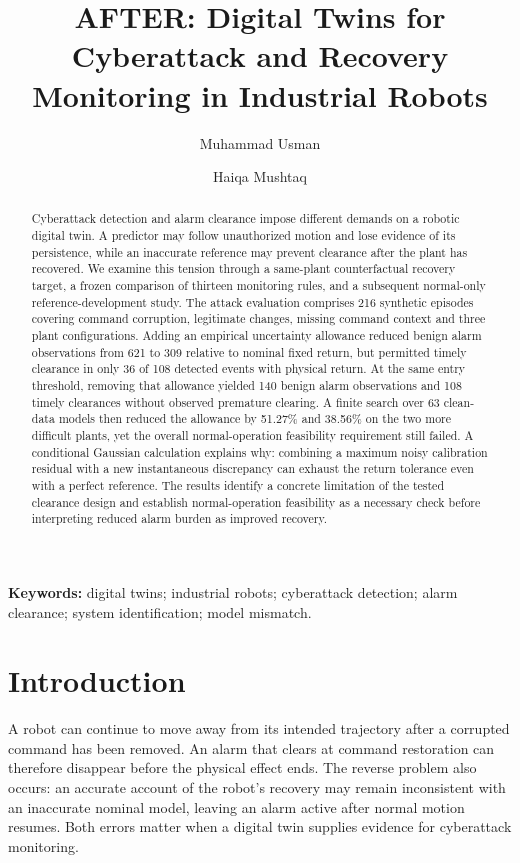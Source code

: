 \documentclass[11pt]{article}
\title{AFTER: Digital Twins for Cyberattack and Recovery Monitoring in Industrial Robots}
\author{Muhammad Usman \and Haiqa Mushtaq}
\date{}
\begin{document}
\maketitle
\begin{abstract}
Cyberattack detection and alarm clearance impose different demands on a robotic digital twin. A predictor may follow unauthorized motion and lose evidence of its persistence, while an inaccurate reference may prevent clearance after the plant has recovered. We examine this tension through a same-plant counterfactual recovery target, a frozen comparison of thirteen monitoring rules, and a subsequent normal-only reference-development study. The attack evaluation comprises 216 synthetic episodes covering command corruption, legitimate changes, missing command context and three plant configurations. Adding an empirical uncertainty allowance reduced benign alarm observations from 621 to 309 relative to nominal fixed return, but permitted timely clearance in only 36 of 108 detected events with physical return. At the same entry threshold, removing that allowance yielded 140 benign alarm observations and 108 timely clearances without observed premature clearing. A finite search over 63 clean-data models then reduced the allowance by 51.27\% and 38.56\% on the two more difficult plants, yet the overall normal-operation feasibility requirement still failed. A conditional Gaussian calculation explains why: combining a maximum noisy calibration residual with a new instantaneous discrepancy can exhaust the return tolerance even with a perfect reference. The results identify a concrete limitation of the tested clearance design and establish normal-operation feasibility as a necessary check before interpreting reduced alarm burden as improved recovery.
\end{abstract}
\noindent\textbf{Keywords:} digital twins; industrial robots; cyberattack detection; alarm clearance; system identification; model mismatch.

\section{Introduction}
A robot can continue to move away from its intended trajectory after a corrupted command has been removed. An alarm that clears at command restoration can therefore disappear before the physical effect ends. The reverse problem also occurs: an accurate account of the robot's recovery may remain inconsistent with an inaccurate nominal model, leaving an alarm active after normal motion resumes. Both errors matter when a digital twin supplies evidence for cyberattack monitoring.
\end{document}
